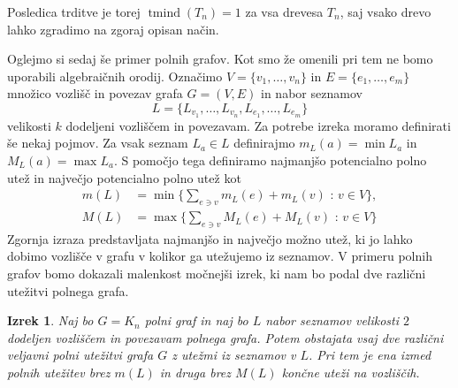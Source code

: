 \documentclass[12pt,a4paper,twoside]{article}
\theoremstyle{definition} %
\theoremstyle{plain} %
\newtheorem{izrek}[definicija]{Izrek}
\numberwithin{equation}{section}  %
\DeclareMathOperator{\tmind}{tmind}
\begin{document}
Posledica trditve je torej $\tmind(T_n) = 1$ za vsa drevesa $T_n$, saj vsako drevo lahko zgradimo na zgoraj opisan način.

Oglejmo si sedaj še primer polnih grafov. Kot smo že omenili pri tem ne bomo uporabili algebraičnih orodij. Označimo $V = \{v_1, \ldots, v_n\}$ in $E = \{e_1, \ldots, e_m\}$ množico vozlišč in povezav grafa $G=(V,E)$ in nabor seznamov
 $$L = \{L_{v_1}, \ldots, L_{v_n}, L_{e_1}, \ldots, L_{e_m}\}$$ velikosti $k$ dodeljeni vozliščem in povezavam. Za potrebe izreka moramo definirati še nekaj pojmov. Za vsak seznam $L_a \in L$ definirajmo $m_L(a) = \min L_a$ in $M_L(a) = \max L_a$. S pomočjo tega definiramo najmanjšo potencialno polno utež in največjo potencialno polno utež kot
\begin{equation*}
\begin{split}
m(L) &= \min \Big \{ \sum_{e \ni v} m_L(e) + m_L(v) \text{ : } v \in V\Big \}, \\
M(L) &= \max \Big\{ \sum_{e \ni v} M_L(e) + M_L(v) \text{ : } v \in V\Big \} 
\end{split}
\end{equation*}
Zgornja izraza predstavljata najmanjšo in največjo možno utež, ki jo lahko dobimo vozlišče v grafu v kolikor ga utežujemo iz seznamov. V primeru polnih grafov bomo dokazali malenkost  močnejši izrek, ki nam bo podal dve različni utežitvi polnega grafa.
\begin{izrek}
Naj bo $G = K_n$ polni graf in naj bo $L$ nabor seznamov velikosti $2$ dodeljen vozliščem in povezavam polnega grafa. Potem obstajata vsaj dve različni veljavni polni utežitvi grafa $G$ z utežmi iz seznamov v $L$. Pri tem je ena izmed polnih utežitev brez $m(L)$ in druga brez $M(L)$ končne uteži na vozliščih.
\end{izrek}
\end{document}
